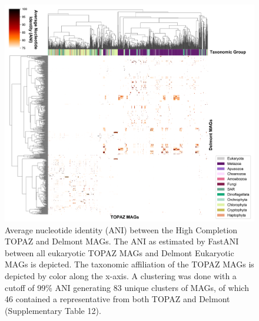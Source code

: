 \documentclass[12pt]{article}
\numberwithin{equation}{section}
\begin{document}
\begin{figure}
    \centering
    \includegraphics[width=0.95\columnwidth]{si-figures/Alexander_Delmont_clustermap-01.png}
    \caption{Average nucleotide identity (ANI) between the High Completion TOPAZ and Delmont MAGs. The ANI as estimated by FastANI between all eukaryotic TOPAZ MAGs and Delmont Eukaryotic MAGs is depicted. The taxonomic affiliation of the TOPAZ MAGs is depicted by color along the x-axis. A clustering was done with a cutoff of 99\% ANI generating 83 unique clusters of MAGs, of which 46 contained a representative from both TOPAZ and Delmont (Supplementary Table 12). }
        \label{fig:delmontfani}
\end{figure}
\end{document}
